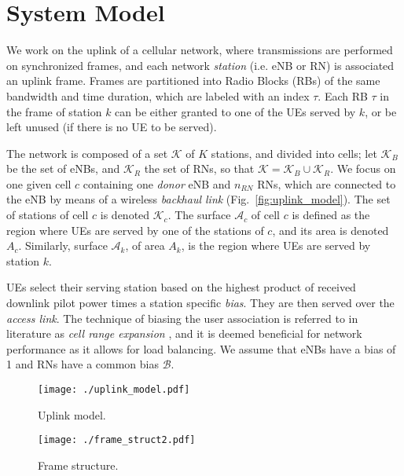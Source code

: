 \documentclass[draftcls,onecolumn]{IEEEtran}
\theoremstyle{plain}
\theoremstyle{definition}
\begin{document}
\section{System Model} \label{system_model}



We work on the uplink of a cellular network, where transmissions are performed on synchronized frames, and each network {\it station} (i.e. eNB or RN) is associated an uplink frame. Frames are partitioned into Radio Blocks (RBs) of the same bandwidth and time duration, which are labeled with an index $\tau$. Each RB $\tau$ in the frame of station $k$ can be either granted to one of the UEs served by $k$, or be left unused (if there is no UE to be served).  

The network is composed of a set $\mathcal{K}$ of $K$ stations, and divided into cells; let $\mathcal{K}_B$ be the set of eNBs, and $\mathcal{K}_R$ the set of RNs, so that $\mathcal{K}=\mathcal{K}_B \cup \mathcal{K}_R$.
We focus on one given cell $c$ containing one {\it donor} eNB \cite{36.814} and $n_{RN}$ RNs, which are connected to the eNB by means of a wireless {\it backhaul link} (Fig.~\ref{fig:uplink_model}). The set of stations of cell $c$ is denoted $\mathcal{K}_c$. The surface $\mathcal{A}_c$ of cell $c$ is defined as the region where UEs are served by one of the stations of $c$, and its area is denoted $A_c$. Similarly, surface $\mathcal{A}_k$, of area $A_k$, is the region where UEs are served by station $k$. 

UEs select their serving station based on the highest product of received downlink pilot power times a station specific {\it bias}. They are then served over the {\it access link}. The technique of biasing the user association is referred to in literature as {\it cell range expansion} \cite{Damnjanovic}, and it is deemed beneficial for network performance as it allows for load balancing. We assume that eNBs have a bias of 1 and RNs have a common bias $\mathcal{B}$.
\begin{figure}
\centering
\begin{minipage}{.47\textwidth}
\centering
\texttt{[image: ./uplink\_model.pdf]} 
\caption{Uplink model.}
\label{fig:uplink_model} 
\end{minipage}\hfill
\begin{minipage}{.47\textwidth}
\centering
\texttt{[image: ./frame\_struct2.pdf]}
 \caption{Frame structure.}
\label{fig:frame_struct} 
\end{minipage}
\end{figure}
\end{document}
